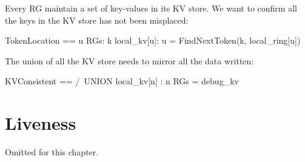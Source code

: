 Every RG maintain a set of key-values in its KV store. We want to confirm all the keys 
in the KV store has not been misplaced:\\

\begin{tla}
TokenLocation == 
    \A u \in RGs:
        \A k \in local_kv[u]: 
            u = FindNextToken(k, local_ring[u])
\end{tla}
\begin{tlatex}
%
%
%
%
\end{tlatex}

The union of all the KV store needs to mirror all the data written:\\

\begin{tla}
KVConsistent == 
    /\ UNION {local_kv[n] : n \in RGs} = debug_kv
\end{tla}
\begin{tlatex}
%
\end{tlatex}

\section{Liveness}

Omitted for this chapter.

% 

